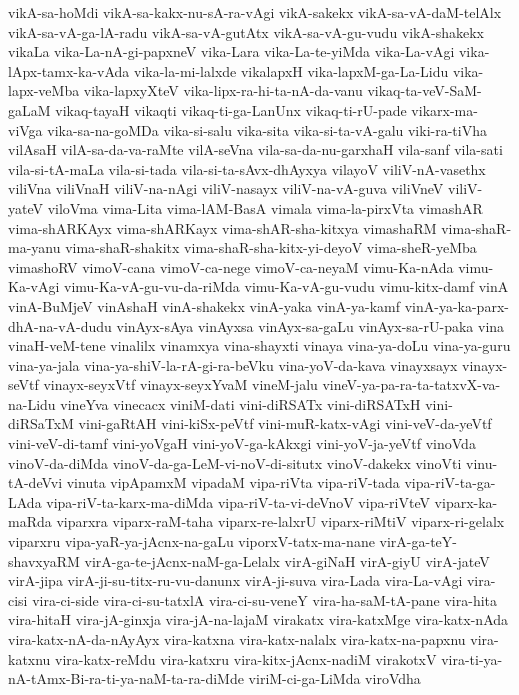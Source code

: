 {vikA-sa-hoMdi
vikA-sa-kakx-nu-sA-ra-vAgi
vikA-sakekx
vikA-sa-vA-daM-telAlx
vikA-sa-vA-ga-lA-radu
vikA-sa-vA-gutAtx
vikA-sa-vA-gu-vudu
vikA-shakekx
vikaLa
vika-La-nA-gi-papxneV
vika-Lara
vika-La-te-yiMda
vika-La-vAgi
vika-lApx-tamx-ka-vAda
vika-la-mi-lalxde
vikalapxH
vika-lapxM-ga-La-Lidu
vika-lapx-veMba
vika-lapxyXteV
vika-lipx-ra-hi-ta-nA-da-vanu
vikaq-ta-veV-SaM-gaLaM
vikaq-tayaH
vikaqti
vikaq-ti-ga-LanUnx
vikaq-ti-rU-pade
vikarx-ma-viVga
vika-sa-na-goMDa
vika-si-salu
vika-sita
vika-si-ta-vA-galu
viki-ra-tiVha
vilAsaH
vilA-sa-da-va-raMte
vilA-seVna
vila-sa-da-nu-garxhaH
vila-sanf
vila-sati
vila-si-tA-maLa
vila-si-tada
vila-si-ta-sAvx-dhAyxya
vilayoV
viliV-nA-vasethx
viliVna
viliVnaH
viliV-na-nAgi
viliV-nasayx
viliV-na-vA-guva
viliVneV
viliV-yateV
viloVma
vima-Lita
vima-lAM-BasA
vimala
vima-la-pirxVta
vimashAR
vima-shARKAyx
vima-shARKayx
vima-shAR-sha-kitxya
vimashaRM
vima-shaR-ma-yanu
vima-shaR-shakitx
vima-shaR-sha-kitx-yi-deyoV
vima-sheR-yeMba
vimashoRV
vimoV-cana
vimoV-ca-nege
vimoV-ca-neyaM
vimu-Ka-nAda
vimu-Ka-vAgi
vimu-Ka-vA-gu-vu-da-riMda
vimu-Ka-vA-gu-vudu
vimu-kitx-damf
vinA
vinA-BuMjeV
vinAshaH
vinA-shakekx
vinA-yaka
vinA-ya-kamf
vinA-ya-ka-parx-dhA-na-vA-dudu
vinAyx-sAya
vinAyxsa
vinAyx-sa-gaLu
vinAyx-sa-rU-paka
vina
vinaH-veM-tene
vinalilx
vinamxya
vina-shayxti
vinaya
vina-ya-doLu
vina-ya-guru
vina-ya-jala
vina-ya-shiV-la-rA-gi-ra-beVku
vina-yoV-da-kava
vinayxsayx
vinayx-seVtf
vinayx-seyxVtf
vinayx-seyxYvaM
vineM-jalu
vineV-ya-pa-ra-ta-tatxvX-va-na-Lidu
vineYva
vinecacx
viniM-dati
vini-diRSATx
vini-diRSATxH
vini-diRSaTxM
vini-gaRtAH
vini-kiSx-peVtf
vini-muR-katx-vAgi
vini-veV-da-yeVtf
vini-veV-di-tamf
vini-yoVgaH
vini-yoV-ga-kAkxgi
vini-yoV-ja-yeVtf
vinoVda
vinoV-da-diMda
vinoV-da-ga-LeM-vi-noV-di-situtx
vinoV-dakekx
vinoVti
vinu-tA-deVvi
vinuta
vipApamxM
vipadaM
vipa-riVta
vipa-riV-tada
vipa-riV-ta-ga-LAda
vipa-riV-ta-karx-ma-diMda
vipa-riV-ta-vi-deVnoV
vipa-riVteV
viparx-ka-maRda
viparxra
viparx-raM-taha
viparx-re-lalxrU
viparx-riMtiV
viparx-ri-gelalx
viparxru
vipa-yaR-ya-jAcnx-na-gaLu
viporxV-tatx-ma-nane
virA-ga-teY-shavxyaRM
virA-ga-te-jAcnx-naM-ga-Lelalx
virA-giNaH
virA-giyU
virA-jateV
virA-jipa
virA-ji-su-titx-ru-vu-danunx
virA-ji-suva
vira-Lada
vira-La-vAgi
vira-cisi
vira-ci-side
vira-ci-su-tatxlA
vira-ci-su-veneY
vira-ha-saM-tA-pane
vira-hita
vira-hitaH
vira-jA-ginxja
vira-jA-na-lajaM
virakatx
vira-katxMge
vira-katx-nAda
vira-katx-nA-da-nAyAyx
vira-katxna
vira-katx-nalalx
vira-katx-na-papxnu
vira-katxnu
vira-katx-reMdu
vira-katxru
vira-kitx-jAcnx-nadiM
virakotxV
vira-ti-ya-nA-tAmx-Bi-ra-ti-ya-naM-ta-ra-diMde
viriM-ci-ga-LiMda
viroVdha
}
